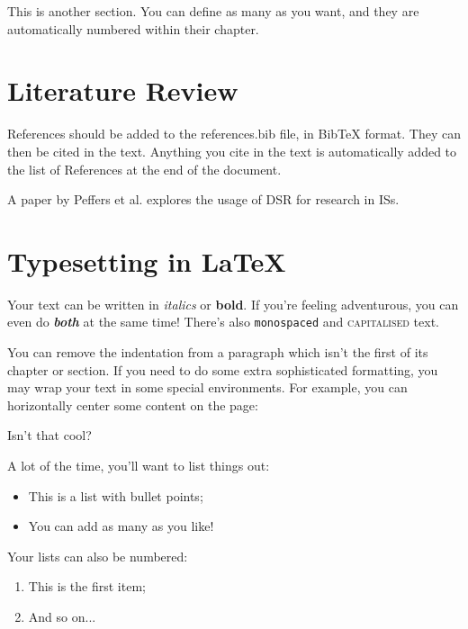 \documentclass[12pt,reqno,twoside]{amsbook}
\begin{document}
This is another section. You can define as many as you want, and they are automatically numbered within their chapter.










\chapter{Literature Review}\label{ch:literature_review}

References should be added to the references.bib file, in BibTeX format. They can then be cited in the text. Anything you cite in the text is automatically added to the list of References at the end of the document.

A paper by Peffers et al. \cite{Peffers2007} explores the usage of \ac{DSR} for research in \acp{IS}.










\chapter{Typesetting in \LaTeX}\label{ch:typesetting}

Your text can be written in \textit{italics} or \textbf{bold}. If you're feeling adventurous, you can even do \textit{\textbf{both}} at the same time! There's also \texttt{monospaced} and \textsc{capitalised} text.

\noindent You can remove the indentation from a paragraph which isn't the first of its chapter or section. If you need to do some extra sophisticated formatting, you may wrap your text in some special environments. For example, you can horizontally center some content on the page:
\begin{center}
    Isn't that cool?
\end{center}

\noindent A lot of the time, you'll want to list things out:
\begin{itemize}
    \item This is a list with bullet points;
    \item You can add as many as you like!
\end{itemize}

\noindent Your lists can also be numbered:
\begin{enumerate}
    \item This is the first item;
    \item And so on...
\end{enumerate}
\end{document}
